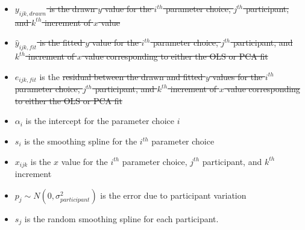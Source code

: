 \documentclass[12pt]{article}
\providecommand{\tightlist}{%
  \setlength{\itemsep}{0pt}\setlength{\parskip}{0pt}}
\providecommand{\DIFaddtex}[1]{{\protect\color{blue}\uwave{#1}}} %
\providecommand{\DIFdeltex}[1]{{\protect\color{red}\sout{#1}}}                      %
\providecommand{\DIFaddbegin}{} %
\providecommand{\DIFaddend}{} %
\providecommand{\DIFdelbegin}{} %
\providecommand{\DIFdelend}{} %
\providecommand{\DIFadd}[1]{\texorpdfstring{\DIFaddtex{#1}}{#1}} %
\providecommand{\DIFdel}[1]{\texorpdfstring{\DIFdeltex{#1}}{}} %
\newcommand{\DIFscaledelfig}{0.5}
\newlength{\DIFdelgraphicswidth} %
\newlength{\DIFdelgraphicsheight} %
\newcommand{\DIFaddincludegraphics}[2][]{{\color{blue}\fbox{\DIFOincludegraphics[#1]{#2}}}} %
\newcommand{\DIFdelincludegraphics}[2][]{%
\sbox{\DIFdelgraphicsbox}{\DIFOincludegraphics[#1]{#2}}%
\settoboxwidth{\DIFdelgraphicswidth}{\DIFdelgraphicsbox} %
\settoboxtotalheight{\DIFdelgraphicsheight}{\DIFdelgraphicsbox} %
\scalebox{\DIFscaledelfig}{%
\parbox[b]{\DIFdelgraphicswidth}{\usebox{\DIFdelgraphicsbox}\\[-\baselineskip] \rule{\DIFdelgraphicswidth}{0em}}\llap{\resizebox{\DIFdelgraphicswidth}{\DIFdelgraphicsheight}{%
\setlength{\unitlength}{\DIFdelgraphicswidth}%
\begin{picture}(1,1)%
\thicklines\linethickness{2pt} %
{\color[rgb]{1,0,0}\put(0,0){\framebox(1,1){}}}%
{\color[rgb]{1,0,0}\put(0,0){\line( 1,1){1}}}%
{\color[rgb]{1,0,0}\put(0,1){\line(1,-1){1}}}%
\end{picture}%
}\hspace*{3pt}}} %
} %
\DeclareRobustCommand{\DIFaddbegin}{\DIFOaddbegin \let\includegraphics\DIFaddincludegraphics} %
\DeclareRobustCommand{\DIFaddend}{\DIFOaddend \let\includegraphics\DIFOincludegraphics} %
\DeclareRobustCommand{\DIFdelbegin}{\DIFOdelbegin \let\includegraphics\DIFdelincludegraphics} %
\DeclareRobustCommand{\DIFdelend}{\DIFOaddend \let\includegraphics\DIFOincludegraphics} %
\begin{document}
\begin{itemize}
\tightlist
\item
  \DIFdelbegin \DIFdel{\(y_{ijk,drawn}\) is the drawn \(y\) value for the \(i^{th}\)
  parameter choice, \(j^{th}\) participant, and \(k^{th}\) increment of
  \(x\) value
}%
\item%
\DIFdel{\(\hat y_{ijk,fit}\) is the fitted \(y\) value for the \(i^{th}\)
  parameter choice, \(j^{th}\) participant, and \(k^{th}\) increment of
  \(x\) value corresponding to either the OLS or PCA fit
}%
\item%
\DIFdelend \(e_{ijk,fit}\) is the \DIFdelbegin \DIFdel{residual between the drawn and fitted \(y\)
  values for the \(i^{th}\) parameter choice, \(j^{th}\) participant,
  and \(k^{th}\) increment of \(x\) value corresponding to either the
  OLS or PCA fit
}\DIFdelend \DIFaddbegin \DIFadd{same as equation
}\DIFaddend \item
  \(\alpha_i\) is the intercept for the parameter choice \(i\)
\item
  \(s_{i}\) is the smoothing spline for the \(i^{th}\) parameter choice
\item
  \(x_{ijk}\) is the \(x\) value for the \(i^{th}\) parameter choice,
  \(j^{th}\) participant, and \(k^{th}\) increment
\item
  \(p_{j} \sim N(0, \sigma^2_{participant})\) is the error due to
  participant variation
\item
  \(s_{j}\) is the random smoothing spline for each participant.
\end{itemize}
\end{document}
